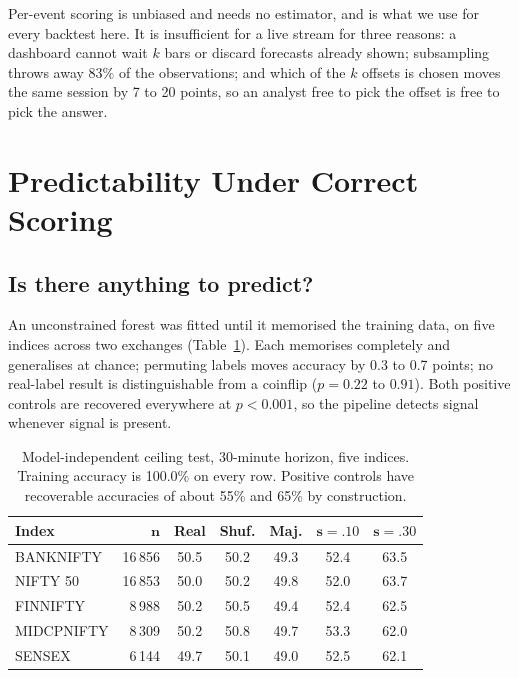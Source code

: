 \documentclass[conference]{IEEEtran}
\begin{document}
Per-event scoring is unbiased and needs no estimator, and is what we use for
every backtest here. It is insufficient for a live stream for three reasons: a
dashboard cannot wait $k$ bars or discard forecasts already shown; subsampling
throws away $83\%$ of the observations; and which of the $k$ offsets is chosen
moves the same session by 7 to 20 points, so an analyst free to pick the offset
is free to pick the answer.

\section{Predictability Under Correct Scoring}
\label{sec:pred}

\subsection{Is there anything to predict?}

An unconstrained forest was fitted until it memorised the training data, on five
indices across two exchanges (Table~\ref{tab:ceiling}). Each memorises
completely and generalises at chance; permuting labels moves accuracy by 0.3 to
0.7 points; no real-label result is distinguishable from a coinflip
($p = 0.22$ to $0.91$). Both positive controls are recovered everywhere at
$p<0.001$, so the pipeline detects signal whenever signal is present.

\begin{table}[t]
\caption{Model-independent ceiling test, 30-minute horizon, five indices.
Training accuracy is 100.0\% on every row. Positive controls have recoverable
accuracies of about 55\% and 65\% by construction.}
\label{tab:ceiling}
\small
\footnotesize
\begin{tabular}{@{}lrccccc@{}}
\toprule
\textbf{Index} & $\boldsymbol{n}$ & \textbf{Real} & \textbf{Shuf.} &
\textbf{Maj.} & $\boldsymbol{s{=}.10}$ & $\boldsymbol{s{=}.30}$ \\
\midrule
BANKNIFTY & 16\,856 & 50.5 & 50.2 & 49.3 & 52.4 & 63.5 \\
NIFTY 50 & 16\,853 & 50.0 & 50.2 & 49.8 & 52.0 & 63.7 \\
FINNIFTY & 8\,988 & 50.2 & 50.5 & 49.4 & 52.4 & 62.5 \\
MIDCPNIFTY & 8\,309 & 50.2 & 50.8 & 49.7 & 53.3 & 62.0 \\
SENSEX & 6\,144 & 49.7 & 50.1 & 49.0 & 52.5 & 62.1 \\
\bottomrule
\end{tabular}
\end{table}
\end{document}
